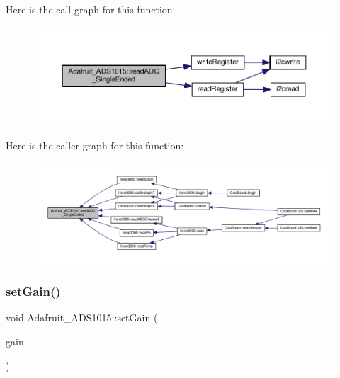 Here is the call graph for this function\+:\nopagebreak
\begin{figure}[H]
\begin{center}
\leavevmode
\includegraphics[width=350pt]{class_adafruit___a_d_s1015_a40f38b9e1f3ec397c0670dd632510235_cgraph}
\end{center}
\end{figure}
Here is the caller graph for this function\+:\nopagebreak
\begin{figure}[H]
\begin{center}
\leavevmode
\includegraphics[width=350pt]{class_adafruit___a_d_s1015_a40f38b9e1f3ec397c0670dd632510235_icgraph}
\end{center}
\end{figure}
\mbox{\label{class_adafruit___a_d_s1015_a399441eace686975ff22937cbe45cc50}} 
\subsubsection{\texorpdfstring{set\+Gain()}{setGain()}}
{\footnotesize\ttfamily void Adafruit\+\_\+\+A\+D\+S1015\+::set\+Gain (\begin{DoxyParamCaption}\item[{\hyperlink{_cool_adafruit___a_d_s1015_8h_a3d6c0e15829a207b9155890811fa4781}{ads\+Gain\+\_\+t}}]{gain }\end{DoxyParamCaption})}



